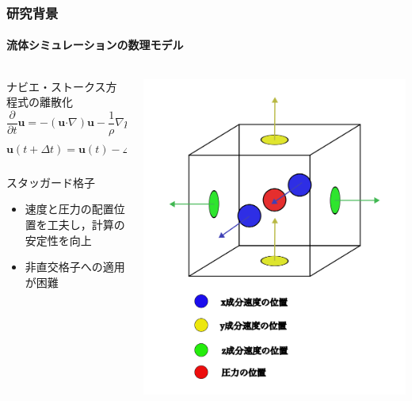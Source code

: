\documentclass[aspectratio=169,dvipdfmx,hyperref={bookmarks=true}]{beamer}
\begin{document}
  \begin{frame}
  \frametitle{研究背景}
  \framesubtitle{流体シミュレーションの数理モデル}

\begin{columns}[T]
	\begin{column}{0.6\linewidth}
	    \begin{block}{ナビエ・ストークス方程式の離散化}
    	\[
	\frac{\partial}{\partial t}\bm{u} = - (\bm{u} \boldsymbol{\cdot}\nabla) \bm{u} - \frac{1}{\rho}\nabla p + \nu\nabla^2\bm{u} + \bm{f}
	\]
    	\[
	\bm{u}(t + \varDelta t)  =\bm{u}(t) -\varDelta t( (\bm{u} \boldsymbol{\cdot}\nabla) \bm{u} - \frac{1}{\rho}\nabla p + \nu\nabla^2\bm{u} + \bm{f})
	\]
\end{block}
	\begin{block}{スタッガード格子}
		\begin{itemize}
		\item 速度と圧力の配置位置を工夫し，計算の安定性を向上
		\item 非直交格子への適用が困難
	\end{itemize}
	\end{block}
    	\end{column}
	\begin{column}{0.35\linewidth}
	\includegraphics[width=1.1\linewidth]{images/3dstaggerd.png}
	\label{fig:staggerd}
    	\end{column}
    \end{columns}
\end{frame}
\end{document}
